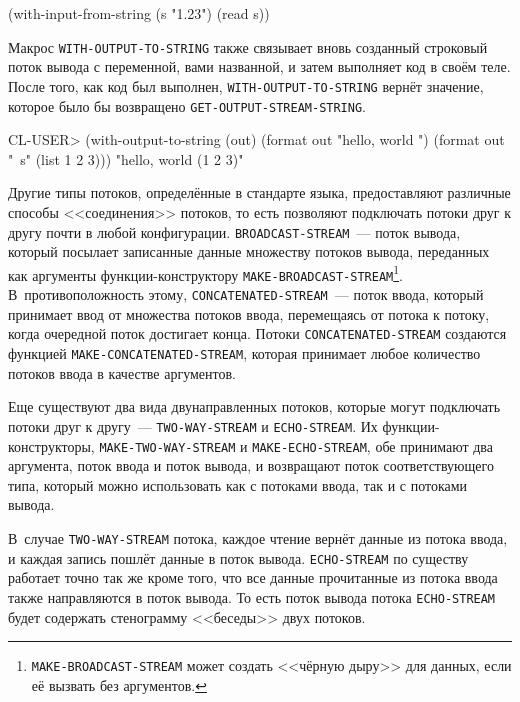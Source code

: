 \begin{myverb}
(with-input-from-string (s "1.23") 
  (read s))
\end{myverb}

Макрос \lstinline{WITH-OUTPUT-TO-STRING} также связывает вновь созданный строковый поток вывода
с переменной, вами названной, и затем выполняет код в своём теле. После того, как код был
выполнен, \lstinline{WITH-OUTPUT-TO-STRING} вернёт значение, которое было бы возвращено
\lstinline{GET-OUTPUT-STREAM-STRING}.
 
\begin{myverb}
CL-USER> (with-output-to-string (out) 
            (format out "hello, world ") 
            (format out "~s" (list 1 2 3))) 
"hello, world (1 2 3)" 
\end{myverb}

Другие типы потоков, определённые в стандарте языка, предоставляют различные способы
<<соединения>> потоков, то есть позволяют подключать потоки друг к другу почти в любой
конфигурации. \lstinline{BROADCAST-STREAM}~--- поток вывода, который посылает записанные данные
множеству потоков вывода, переданных как аргументы функции-конструктору
\lstinline{MAKE-BROADCAST-STREAM}\footnote{\lstinline{MAKE-BROADCAST-STREAM} может создать <<чёрную
  дыру>> для данных, если её вызвать без аргументов.}\hspace{\footnotenegspace}. В~противоположность этому,
\lstinline{CONCATENATED-STREAM}~--- поток ввода, который принимает ввод от множества потоков
ввода, перемещаясь от потока к потоку, когда очередной поток достигает конца. Потоки
\lstinline{CONCATENATED-STREAM} создаются функцией \lstinline{MAKE-CONCATENATED-STREAM}, которая
принимает любое количество потоков ввода в качестве аргументов.

Еще существуют два вида двунаправленных потоков, которые могут подключать потоки друг к
другу~--- \lstinline{TWO-WAY-STREAM} и \lstinline{ECHO-STREAM}. Их функции-конструкторы,
\lstinline{MAKE-TWO-WAY-STREAM} и \lstinline{MAKE-ECHO-STREAM}, обе принимают два аргумента, поток
ввода и поток вывода, и возвращают поток соответствующего типа, который можно использовать
как с потоками ввода, так и с потоками вывода.

В~случае \lstinline{TWO-WAY-STREAM} потока, каждое чтение вернёт данные из потока ввода, и
каждая запись пошлёт данные в поток вывода. \lstinline{ECHO-STREAM} по существу работает точно
так же кроме того, что все данные прочитанные из потока ввода также направляются в поток
вывода. То есть поток вывода потока \lstinline{ECHO-STREAM} будет содержать стенограмму
<<беседы>> двух потоков.

